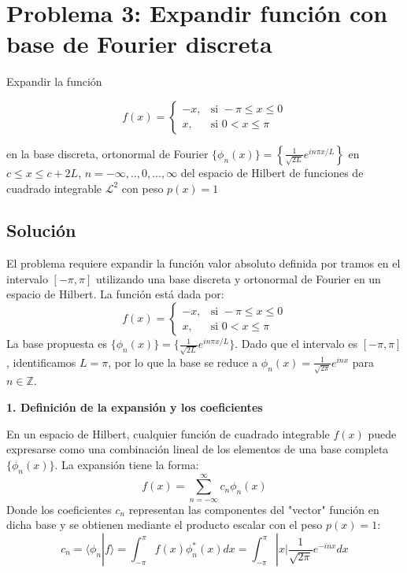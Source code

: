 \documentclass[a4paper]{article}
\begin{document}
\section{Problema 3: Expandir función con base de Fourier discreta}
Expandir la función 

$$
f(x) =
\begin{cases}
-x, & \text{si }  -\pi \leq x \leq 0 \\
x, & \text{si } 0 < x \leq \pi
\end{cases}
$$

en la base discreta, ortonormal de Fourier $\{\phi_n(x)\} = 	\left\{\frac{1}{\sqrt{2L}}e^{i n\pi x /L}\right\}$ en $c\leq x \leq c+2L$, $n=-\infty, .., 0, ..., \infty$ del espacio de Hilbert de funciones de cuadrado integrable $\mathscr{L}^2$ con peso $p(x)=1$


\subsection{Solución	}

El problema requiere expandir la función valor absoluto definida por tramos en el intervalo $[-\pi, \pi]$ utilizando una base discreta y ortonormal de Fourier en un espacio de Hilbert. La función está dada por:
\begin{equation}
f(x) = \begin{cases} -x, & \text{si } -\pi \leq x \leq 0 \\ x, & \text{si } 0 < x \leq \pi \end{cases}
\end{equation}
La base propuesta es $\{\phi_n(x)\} = \{ \frac{1}{\sqrt{2L}} e^{in\pi x/L} \}$. Dado que el intervalo es $[-\pi, \pi]$, identificamos $L = \pi$, por lo que la base se reduce a $\phi_n(x) = \frac{1}{\sqrt{2\pi}} e^{inx}$ para $n \in \mathbb{Z}$.

\textbf{1. Definición de la expansión y los coeficientes}

En un espacio de Hilbert, cualquier función de cuadrado integrable $f(x)$ puede expresarse como una combinación lineal de los elementos de una base completa $\{\phi_n(x)\}$. La expansión tiene la forma:
\begin{equation}
f(x) = \sum_{n=-\infty}^{\infty} c_n \phi_n(x)
\end{equation}
Donde los coeficientes $c_n$ representan las componentes del "vector" función en dicha base y se obtienen mediante el producto escalar con el peso $p(x) = 1$:
\begin{equation}
c_n = \langle \phi_n | f \rangle = \int_{-\pi}^{\pi} f(x) \phi_n^*(x) dx = \int_{-\pi}^{\pi} |x| \frac{1}{\sqrt{2\pi}} e^{-inx} dx
\end{equation}
\end{document}
